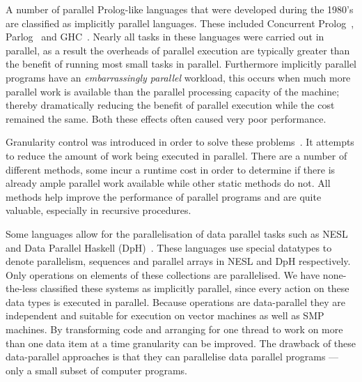 A number of parallel Prolog-like languages that were developed during the
1980's are classified as implicitly parallel languages.
These included Concurrent
Prolog~\citep{saraswat85:probl_with_concur_prolog,saraswat86:concurrent_prolog_definition,shapiro:flat_concur_prolog},
Parlog~\citep{clark:84:parlog_sys_prog,clark:86:parlog} and GHC~\citep{ueda:ghc}.
Nearly all tasks in these languages were carried out in
parallel,
as a result the overheads of parallel execution are typically
greater than the benefit of running most small tasks in parallel.
Furthermore implicitly parallel programs have an \emph{embarrassingly
  parallel} workload,
this occurs when much more parallel work is available than the parallel
processing capacity of the machine;
thereby dramatically reducing the benefit of parallel execution while
the cost remained the same.
Both these effects often caused very poor performance.

Granularity control was introduced in order to solve these
problems~\citep{lopez96:distance_granularity,shen_98_granularity-control}.
It attempts to reduce the amount of work being executed in parallel.
There are a number of different methods, some incur a
runtime cost in order to determine if there is already ample parallel
work available while other static methods do not.
All methods help improve the performance of parallel programs and are
quite valuable, especially in recursive procedures.

Some languages allow for the parallelisation of data parallel
tasks such as NESL~\citep{blelloch:95:nesl} and Data Parallel
Haskell (DpH)~\citep{dph:2007:status_report,dph:2008:harnessing_the_multicores}.
These languages use special datatypes to denote parallelism,
sequences and parallel arrays in NESL and DpH respectively.
Only operations on elements of these collections are parallelised.
We have none-the-less classified these systems as implicitly parallel,
since every action on these data types is executed in parallel.
Because operations are data-parallel they are independent and suitable
for execution on vector machines as well as SMP machines.
By transforming code and arranging for one thread to work on more than
one data item at a time granularity can be improved.
The drawback of these data-parallel approaches is that they can
parallelise data parallel programs
--- only a small subset of computer programs.


